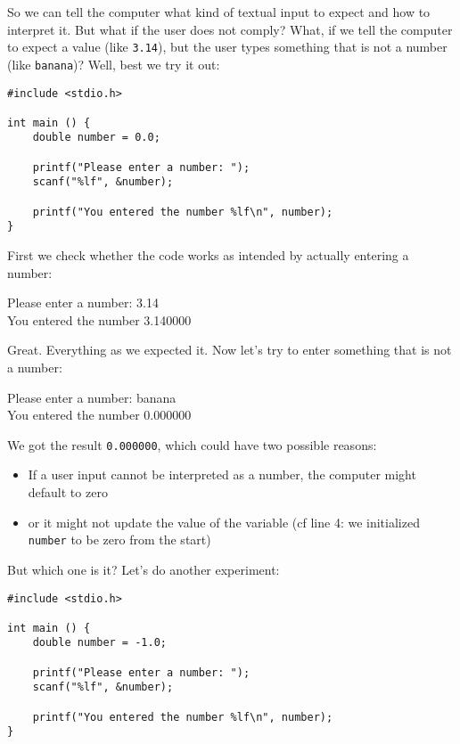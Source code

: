 So we can tell the computer what kind of textual input to expect and how to interpret it. But what if the user does not comply? What, if we tell the computer to expect a  value (like \texttt{3.14}), but the user types something that is not a number (like \texttt{banana})? Well, best we try it out:

\begin{codebox}[inputNumber.c]
\begin{verbatim}
#include <stdio.h>

int main () {
    double number = 0.0;

    printf("Please enter a number: ");
    scanf("%lf", &number);

    printf("You entered the number %lf\n", number);
}
\end{verbatim}
\end{codebox}

First we check whether the code works as intended by actually entering a number:
\begin{cmdbox}
Please enter a number: 3.14 \\
You entered the number 3.140000
\end{cmdbox}

Great. Everything as we expected it. Now let's try to enter something that is not a number:
\begin{cmdbox}
Please enter a number: banana \\
You entered the number 0.000000
\end{cmdbox}

We got the result \texttt{0.000000}, which could have two possible reasons:
\begin{itemize}
\item If a user input cannot be interpreted as a number, the computer might default to zero
\item or it might not update the value of the variable (cf line 4: we initialized \texttt{number} to be zero from the start)
\end{itemize}
But which one is it? Let's do another experiment:
\begin{codebox}[inputNumberAlt.c]
\begin{verbatim}
#include <stdio.h>

int main () {
    double number = -1.0;

    printf("Please enter a number: ");
    scanf("%lf", &number);

    printf("You entered the number %lf\n", number);
}
\end{verbatim}
\end{codebox}

